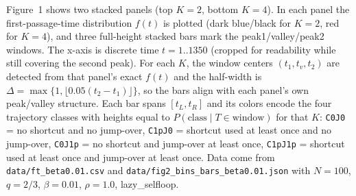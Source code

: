 \documentclass[11pt]{article}
\begin{document}
\noindent
Figure~1 shows two stacked panels (top $K=2$, bottom $K=4$). In each panel the
first-passage-time distribution $f(t)$ is plotted (dark blue/black for $K=2$,
red for $K=4$), and three full-height stacked bars mark the peak1/valley/peak2
windows. The x-axis is discrete time $t=1..1350$ (cropped for readability while
still covering the second peak). For each $K$, the window centers
$(t_1,t_v,t_2)$ are detected from that panel's exact $f(t)$ and the half-width
is $\Delta=\max\{1,\lfloor 0.05(t_2-t_1)\rfloor\}$, so the bars align with each
panel's own peak/valley structure. Each bar spans $[t_L,t_R]$ and its colors
encode the four trajectory classes with heights equal to
$P(\text{class}\mid T\in\text{window})$ for that $K$:
\texttt{C0J0} = no shortcut and no jump-over,
\texttt{C1pJ0} = shortcut used at least once and no jump-over,
\texttt{C0J1p} = no shortcut and jump-over at least once,
\texttt{C1pJ1p} = shortcut used at least once and jump-over at least once.
Data come from \texttt{data/ft\_beta0.01.csv} and
\texttt{data/fig2\_bins\_bars\_beta0.01.json} with
$N=100$, $q=2/3$, $\beta=0.01$, $\rho=1.0$, lazy\_selfloop.
\end{document}
